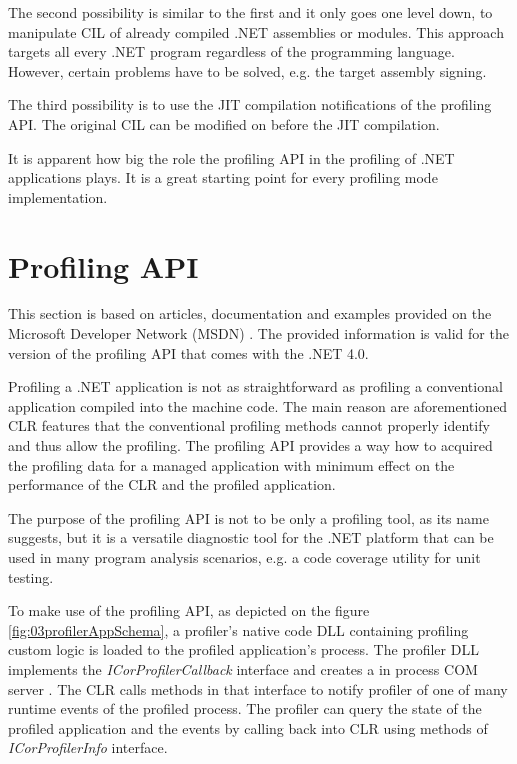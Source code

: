 The second possibility is similar to the first and it only goes one level down, to manipulate CIL of already compiled .NET assemblies or modules. This approach targets all every .NET program regardless of the programming language. However, certain problems have to be solved, e.g. the target assembly signing.

The third possibility is to use the JIT compilation notifications of the profiling API. The original CIL can be modified on before the JIT compilation.

It is apparent how big the role the profiling API in the profiling of .NET applications plays. It is a great starting point for every profiling mode implementation.

\section{Profiling API}
This section is based on articles, documentation and examples provided on the Microsoft Developer Network (MSDN) \cite{ProfMSDN}. The provided information is valid for the version of the profiling API that comes with the .NET 4.0. 

Profiling a .NET application is not as straightforward as profiling a conventional application compiled into the machine code. The main reason are aforementioned CLR features that the conventional profiling methods cannot properly identify and thus allow the profiling. The profiling API provides a way how to acquired the profiling data for a managed application with minimum effect on the performance of the CLR and the profiled application. 

The purpose of the profiling API is not to be only a profiling tool, as its name suggests, but it is a versatile diagnostic tool for the .NET platform that can be used in many program analysis scenarios, e.g. a code coverage utility for unit testing.

To make use of the profiling API, as depicted on the figure \ref{fig:03profilerAppSchema}, a profiler's native code DLL containing profiling custom logic is loaded to the profiled application's process. The profiler DLL implements the \textit{ICorProfilerCallback} interface and creates a in process COM server . The CLR calls methods in that interface to notify profiler of one of many runtime events of the profiled process. The profiler can query the state of the profiled application and the events by calling back into CLR using methods of \textit{ICorProfilerInfo} interface.

